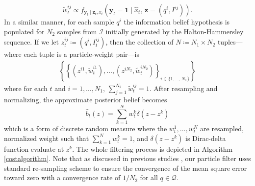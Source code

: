 \documentclass[letterpaper, 10 pt, conference]{ieeeconf}
\begin{document}
\begin{equation*}
\widetilde{w}_t^{ij} \propto f_{\bm{y}_t \mid \bm{z}_t,x_t}(\bm{y}_t = \bm{1} \mid \hat{x}_t,\, \bm{z}=(q^i,I^{ij})).
\end{equation*}
In a similar manner, for each sample $q^{i}$
the information belief hypothesis is populated for $N_2$ samples from $\mathcal{I}$ initially generated by the Halton-Hammersley sequence. If we let $z_t^{ij} \coloneqq (q^{i},I_t^{ij})$, then the collection of $N\coloneqq N_1\times N_2$ tuples---where each tuple is a particle-weight pair---is
\begin{align*}
\left\{
\left\{
\left(
z^{i1},\widetilde{w}_{t}^{i1}\right),\dots,\left(
z^{iN_2},\widetilde{w}_{t}^{iN_2}\right) \right\}_{i\in \lbrace 1,\dots,N_1\rbrace}\right\}
\end{align*}
where for each $t$ and $i = 1,\dots,N_1$, $\sum_{j=1}^{N_2} \widetilde{w}_{t}^{ij} = 1$.
After resampling and normalizing, the approximate posterior belief becomes
\begin{equation*}
\hat{b}_t(z) = \sum_{k=1}^{N} 
w_t^{k} \delta(z - z^{k})
\end{equation*}
which is a form of discrete random measure where the $w_t^1,\dots,w_t^N$ are resampled, normalized weight such that $\sum_{k=1}^{N} w_t^{k} = 1$, and $\delta(z - z^{k})$ is Dirac-delta function evaluate at $z^{k}$. 
The whole filtering process is depicted in Algorithm \ref{costalgorithm}.
Note that as discussed in previous studies \cite{crisan2002survey}, our particle filter uses standard re-sampling scheme to ensure the convergence of the mean square error toward zero with a convergence rate of $1/N_2$ for all $q \in \mathcal{Q}$. 
\end{document}
